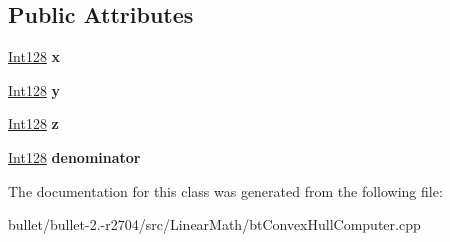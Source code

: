 \subsection*{Public Attributes}
\begin{DoxyCompactItemize}
\item 
\hypertarget{classbt_convex_hull_internal_1_1_point_r128_ad38ad0a85f2fb807e1f7058dddc8331c}{\hyperlink{classbt_convex_hull_internal_1_1_int128}{Int128} {\bfseries x}}\label{classbt_convex_hull_internal_1_1_point_r128_ad38ad0a85f2fb807e1f7058dddc8331c}

\item 
\hypertarget{classbt_convex_hull_internal_1_1_point_r128_a4a8fb358cf198c529ec30438d0ec2540}{\hyperlink{classbt_convex_hull_internal_1_1_int128}{Int128} {\bfseries y}}\label{classbt_convex_hull_internal_1_1_point_r128_a4a8fb358cf198c529ec30438d0ec2540}

\item 
\hypertarget{classbt_convex_hull_internal_1_1_point_r128_ad49cca5b3aead3090a35fef224894343}{\hyperlink{classbt_convex_hull_internal_1_1_int128}{Int128} {\bfseries z}}\label{classbt_convex_hull_internal_1_1_point_r128_ad49cca5b3aead3090a35fef224894343}

\item 
\hypertarget{classbt_convex_hull_internal_1_1_point_r128_a8aa1216b61513babf090b0d6d6fc0f52}{\hyperlink{classbt_convex_hull_internal_1_1_int128}{Int128} {\bfseries denominator}}\label{classbt_convex_hull_internal_1_1_point_r128_a8aa1216b61513babf090b0d6d6fc0f52}

\end{DoxyCompactItemize}


The documentation for this class was generated from the following file\+:\begin{DoxyCompactItemize}
\item 
bullet/bullet-\/2.-\/r2704/src/\+Linear\+Math/bt\+Convex\+Hull\+Computer.\+cpp\end{DoxyCompactItemize}
